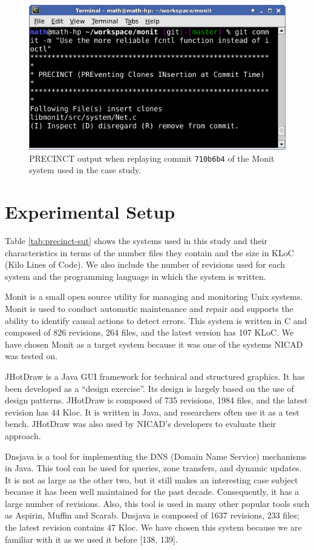 \documentclass[12pt]{report}
\begin{document}
\begin{figure}
  \centering
  \includegraphics[width=\linewidth]{media/chap5/commit.png}
  \caption{PRECINCT output when replaying commit \texttt{710b6b4} of the Monit system used in the case study.\label{fig:precinct-hook}}
\end{figure}

\section{Experimental Setup}\label{experimental-setup-1}

Table \ref{tab:precinct-sut} shows the systems used in this study and
their characteristics in terms of the number files they contain and the
size in KLoC (Kilo Lines of Code). We also include the number of
revisions used for each system and the programming language in which the
system is written.

Monit is a small open source utility for managing and monitoring Unix
systems. Monit is used to conduct automatic maintenance and repair and
supports the ability to identify causal actions to detect errors. This
system is written in C and composed of 826 revisions, 264 files, and the
latest version has 107 KLoC. We have chosen Monit as a target system
because it was one of the systems NICAD was tested on.

JHotDraw is a Java GUI framework for technical and structured graphics.
It has been developed as a ``design exercise''. Its design is largely
based on the use of design patterns. JHotDraw is composed of 735
revisions, 1984 files, and the latest revision has 44 Kloc. It is
written in Java, and researchers often use it as a test bench. JHotDraw
was also used by NICAD's developers to evaluate their approach.

Dnsjava is a tool for implementing the DNS (Domain Name Service)
mechanisms in Java. This tool can be used for queries, zone transfers,
and dynamic updates. It is not as large as the other two, but it still
makes an interesting case subject because it has been well maintained
for the past decade. Consequently, it has a large number of revisions.
Also, this tool is used in many other popular tools such as Aspirin,
Muffin and Scarab. Dnsjava is composed of 1637 revisions, 233 files; the
latest revision contains 47 Kloc. We have chosen this system because we
are familiar with it as we used it before {[}138, 139{]}.
\end{document}

